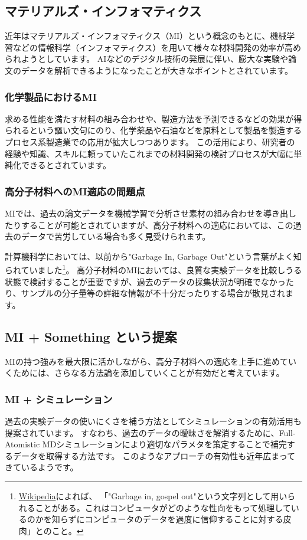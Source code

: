 \documentclass[a4paper,11pt]{jlreq}
\begin{document}
\subsection{マテリアルズ・インフォマティクス}
近年はマテリアルズ・インフォマティクス（MI）という概念のもとに、機械学習などの情報科学（インフォマティクス）を用いて様々な材料開発の効率が高められようとしています。
AIなどのデジタル技術の発展に伴い、膨大な実験や論文のデータを解析できるようになったことが大きなポイントとされています。

\subsubsection{化学製品におけるMI}
求める性能を満たす材料の組み合わせや、製造方法を予測できるなどの効果が得られるという謳い文句にのり、化学薬品や石油などを原料として製品を製造するプロセス系製造業での応用が拡大しつつあります。
この活用により、研究者の経験や知識、スキルに頼っていたこれまでの材料開発の検討プロセスが大幅に単純化できるとされています。

\subsubsection{高分子材料へのMI適応の問題点}
MIでは、過去の論文データを機械学習で分析させ素材の組み合わせを導き出したりすることが可能とされていますが、高分子材料への適応においては、この過去のデータで苦労している場合も多く見受けられます。

計算機科学においては、以前から"Garbage In, Garbage Out"という言葉がよく知られていました\footnote{
    \href{https://ja.wikipedia.org/wiki/Garbage_in,_garbage_out}{Wikipedia}によれば、 「"Garbage in, gospel out"という文字列として用いられることがある。これはコンピュータがどのような性向をもって処理しているのかを知らずにコンピュータのデータを過度に信仰することに対する皮肉」とのこと。
}。
高分子材料のMIにおいては、良質な実験データを比較しうる状態で検討することが重要ですが、過去のデータの採集状況が明確でなかったり、サンプルの分子量等の詳細な情報が不十分だったりする場合が散見されます。

\subsection{MI + Something という提案}
MIの持つ強みを最大限に活かしながら、高分子材料への適応を上手に進めていくためには、さらなる方法論を添加していくことが有効だと考えています。
\subsubsection{MI + シミュレーション}
過去の実験データの使いにくさを補う方法としてシミュレーションの有効活用も提案されています。
すなわち、過去のデータの曖昧さを解消するために、Full-Atomistic MDシミュレーションにより適切なパラメタを策定することで補完するデータを取得する方法です。
このようなアプローチの有効性も近年広まってきているようです。
\end{document}

